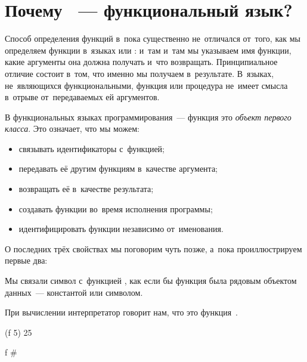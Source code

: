 \label{Less:functions}


\section[4]{Почему \Scheme~--- функциональный язык?}%
Способ определения функций в~\Scheme пока существенно не~отличался от~того, как мы определяем функции в~языках  или : и~там и~там мы указываем имя функции, какие аргументы она должна получать и~что возвращать. Принципиальное отличие состоит в~том, что именно мы получаем в~результате. В~языках, не~являющихся функциональными, функция или процедура не~имеет смысла в~отрыве от~передаваемых ей аргументов.

\label{first-class}В функциональных языках программирования~--- функция это \emph{объект первого класса}. Это означает, что мы можем:

\begin{itemize}[--]
 \item связывать идентификаторы с~функцией;

 \item передавать её другим функциям в~качестве аргумента;

 \item возвращать её в~качестве результата;

 \item создавать функции во~время исполнения программы;

 \item идентифицировать функции независимо от~именования.
\end{itemize}

О последних трёх свойствах мы поговорим чуть позже, а~пока проиллюстрируем первые два:

\begin{example}{Мы связали символ  с~функцией ,  как если бы функция  была рядовым объектом данных~--- константой или символом.

При вычислении  интерпретатор говорит нам, что это функция~.}
\REPL
  {(f 5)}
  {25}

\REPL
  {f}
  {\#<procedure:sqr>}
\end{example}


